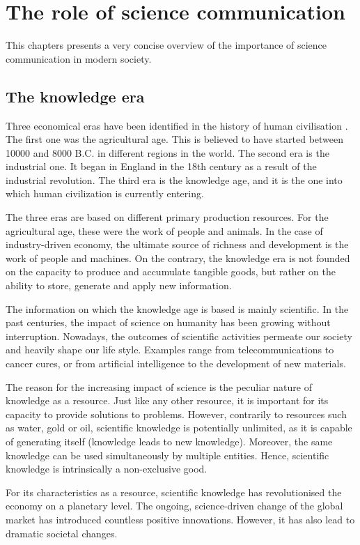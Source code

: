 \chapter{The role of science communication}
This chapters presents a very concise overview of the importance of science communication in modern society. 

\section{The knowledge era} \label{The_knowledge_era}
Three economical eras have been identified in the history of human civilisation \cite{Aasi1}. The first one was the agricultural age. This is believed to have started between 10000 and 8000 B.C. in different regions in the world. The second era is the industrial one. It began in England in the 18th century as a result of the industrial revolution. The third era is the knowledge age, and it is the one into which human civilization is currently entering. 

The three eras are based on different primary production resources. For the agricultural age, these were the work of people and animals. In the case of industry-driven economy, the ultimate source of richness and development is the work of people and machines. On the contrary, the knowledge era is not founded on the capacity to produce and accumulate tangible goods, but rather on the ability to store, generate and apply new information.

The information on which the knowledge age is based is mainly scientific. In the past centuries, the impact of science on humanity has been growing without interruption. Nowadays, the outcomes of scientific activities permeate our society and heavily shape our life style. Examples range from telecommunications to cancer cures, or from artificial intelligence to the development of new materials.

The reason for the increasing impact of science is the peculiar nature of knowledge as a resource. Just like any other resource, it is important for its capacity to provide solutions to problems. However, contrarily to resources such as water, gold or oil, scientific knowledge is potentially unlimited, as it is capable of generating itself (knowledge leads to new knowledge). Moreover, the same knowledge can be used simultaneously by multiple entities. Hence, scientific knowledge is intrinsically a non-exclusive good.

For its characteristics as a resource, scientific knowledge has revolutionised the economy on a planetary level. The ongoing, science-driven change of the global market has introduced countless positive innovations. However, it has also lead to dramatic societal changes.   

